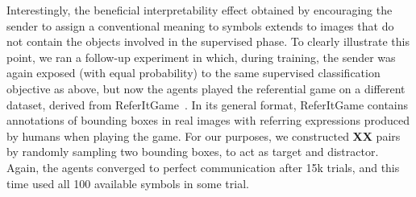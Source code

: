 Interestingly, the beneficial interpretability effect obtained by
encouraging the sender to assign a conventional meaning to symbols
extends to images that do not contain the objects involved in the
supervised phase. To clearly illustrate this point, we ran a follow-up
experiment in which, during training, the sender was again exposed (with
equal probability) to the same supervised classification objective as
above, but now the agents %
played the referential game on a different dataset, derived from
ReferItGame~\citep{Kazemzadeh:etal:2014}. In its general format,
ReferItGame contains annotations of bounding boxes in real images with
referring expressions produced by humans when playing the
game. %
For our purposes, we constructed \textbf{XX} pairs by randomly
sampling two bounding boxes, to act as target and distractor.  Again,
the agents converged to perfect communication after 15k trials, and
this time used all 100 available symbols in some trial.

